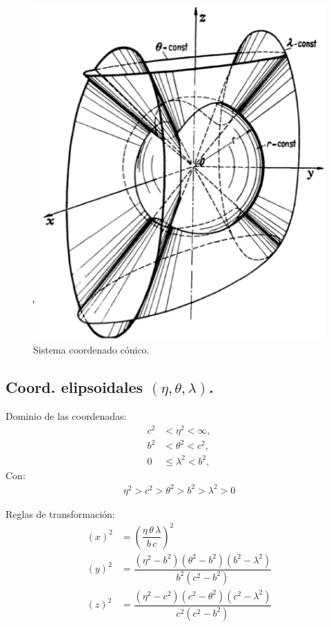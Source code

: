 \begin{figure}[H]
    \centering
    \includegraphics[scale=0.5]{Imagenes/Sistema_Conico.eps}
    \caption{Sistema coordenado cónico.}
\end{figure}

\subsection{Coord. elipsoidales \texorpdfstring{$(\eta, \theta, \lambda)$}{(e, t, l)}.}

Dominio de las coordenadas:
\begin{align*}
c^{2} &< \eta^{2} < \infty, \\
b^{2} &< \theta^{2} < c^{2}, \\
0 &\leq \lambda^{2} < b^{2},
\end{align*}
Con:
\begin{align*}
\eta^{2} > c^{2} > \theta^{2} > b^{2} > \lambda^{2} > 0
\end{align*}

Reglas de transformación:
\begin{align*}
(x)^{2} &= \left( \dfrac{\eta \, \theta \, \lambda}{b \, c} \right)^{2} \\[0.5em]
(y)^{2} &= \dfrac{(\eta^{2} - b^{2})(\theta^{2} - b^{2})(b^{2} - \lambda^{2})}{b^{2}(c^{2} - b^{2})} \\[0.5em]
(z)^{2} &= \dfrac{(\eta^{2} - c^{2}) (c^{2} - \theta^{2})(c^{2} - \lambda^{2})}{c^{2} (c^{2} - b^{2})}
\end{align*}

